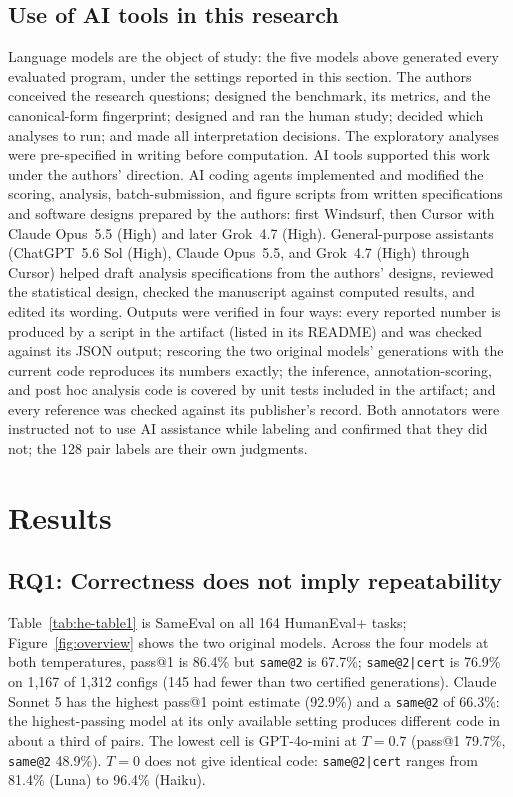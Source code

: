 \documentclass[acmsmall,screen,review,anonymous]{acmart}
\makeatletter
\newcommand{\sameeval}{SameEval}
\newcommand{\sameat}{\mbox{\texttt{same@2}}}
\newcommand{\sameatc}{\mbox{\texttt{same@2|cert}}}
\makeatother
\begin{document}
\subsection{Use of AI tools in this research}
\label{sec:ai-use}
Language models are the object of study: the five models above generated
every evaluated program, under the settings reported in this section.
The authors conceived the research questions; designed the benchmark, its
metrics, and the canonical-form fingerprint; designed and ran the human study;
decided which analyses to run; and made all interpretation decisions.
The exploratory analyses were pre-specified in writing before computation.
AI tools supported this work under the authors' direction.
AI coding agents implemented and modified the scoring, analysis,
batch-submission, and figure scripts from written specifications and software
designs prepared by the authors: first Windsurf, then Cursor with Claude
Opus~5.5 (High) and later Grok~4.7 (High).
General-purpose assistants (ChatGPT~5.6 Sol (High), Claude Opus~5.5, and
Grok~4.7 (High) through Cursor) helped draft analysis specifications from the
authors' designs, reviewed the statistical design, checked the manuscript
against computed results, and edited its wording.
Outputs were verified in four ways: every reported number is produced by a
script in the artifact (listed in its README) and was checked against its
JSON output; rescoring the two original models' generations with the current code reproduces
its numbers exactly; the inference, annotation-scoring, and post hoc analysis
code is covered by unit tests included in the artifact; and every reference
was checked against its publisher's record.
Both annotators were instructed not to use AI assistance while labeling and
confirmed that they did not; the 128 pair labels are their own judgments.

\section{Results}
\label{sec:results}

\subsection{RQ1: Correctness does not imply repeatability}
\label{sec:rq1}

Table~\ref{tab:he-table1} is \sameeval{} on all 164 HumanEval+ tasks; Figure~\ref{fig:overview} shows the two original models.
Across the four models at both temperatures, pass@1 is 86.4\% but \sameat{} is 67.7\%; \sameatc{} is
76.9\% on 1{,}167 of 1{,}312 configs (145 had fewer than two certified
generations).
Claude Sonnet 5 has the highest pass@1 point estimate (92.9\%) and a
\sameat{} of 66.3\%: the highest-passing model at its only available setting
produces different code in about a third of pairs.
The lowest cell is GPT-4o-mini at $T{=}0.7$ (pass@1 79.7\%, \sameat{}
48.9\%).
$T{=}0$ does not give identical code: \sameatc{} ranges from 81.4\% (Luna) to
96.4\% (Haiku).
\end{document}
